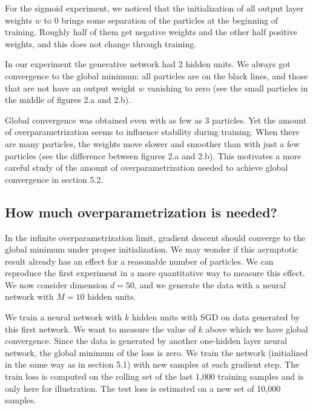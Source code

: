 \documentclass[a4paper, 11pt]{scrartcl}
\begin{document}
{For the sigmoid experiment, we noticed that the initialization of all output layer weights $w$ to 0 brings some separation of the particles at the beginning of training. Roughly half of them get negative weights and the other half positive weights, and this does not change through training.

In our experiment the generative network had 2 hidden units. We always got convergence to the global minimum: all particles are on the black lines, and those that are not have an output weight $w$ vanishing to zero (see the small particles in the middle of figures 2.a and 2.b).


Global convergence was obtained even with as few as 3 particles. Yet the amount of overparametrization seems to influence stability during training. When there are many particles, the weights move slower and smoother than with just a few particles (see the difference between figures 2.a and 2.b). This motivates a more careful study of the amount of overparametrization needed to achieve global convergence in section 5.2.

\subsection{How much overparametrization is needed?}

In the infinite overparametrization limit, gradient descent should converge to the global minimum under proper initialization. We may wonder if this asymptotic result already has an effect for a reasonable number of particles. We can reproduce the first experiment in a more quantitative way to measure this effect. We now consider dimension $d=50$, and we generate the data with a neural network with $M=10$ hidden units.

We train a neural network with $k$ hidden units with SGD on data generated by this first network. We want to measure the value of $k$ above which we have global convergence. Since the data is generated by another one-hidden layer neural network, the global minimum of the loss is zero. We train the network (initialized in the same way as in section 5.1) with new samples at each gradient step. The train loss is computed on the rolling set of the last 1,000 training samples and is only here for illustration. The test loss is estimated on a new set of 10,000 samples.


}
\end{document}

